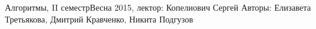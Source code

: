 


\BigHeader
	{Алгоритмы, II семестр}{Весна 2015, лектор: Копелиович Сергей}
	{Авторы: Елизавета Третьякова, Дмитрий Кравченко, Никита Подгузов}






